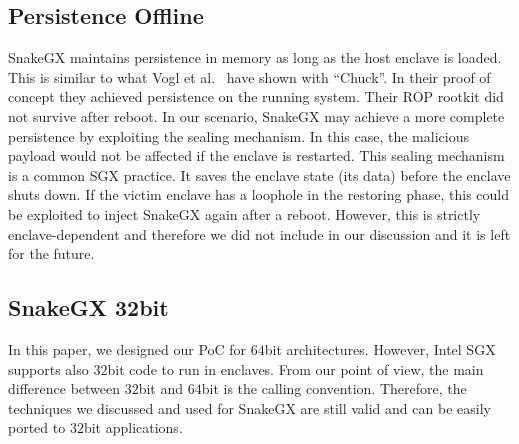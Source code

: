 \subsection{Persistence Offline}
SnakeGX maintains persistence in memory as long as the host enclave is loaded.
This is similar to what Vogl et al.~\cite{vogl2014persistent} have shown with 
``Chuck''.
In their proof of concept they achieved persistence on the running system. 
Their ROP rootkit did not survive after reboot.
In our scenario, SnakeGX may achieve a more complete persistence by exploiting 
the sealing mechanism.
In this case, the malicious payload would not be affected if the enclave is 
restarted.
This sealing mechanism is a common SGX practice. It saves the enclave state 
(\ie its data) before the enclave shuts down.
If the victim enclave has a loophole in the restoring phase, this could be 
exploited to inject SnakeGX again after a reboot.
However, this is strictly enclave-dependent and therefore we did not include in 
our discussion and it is left for the future.

\subsection{SnakeGX 32bit}
In this paper, we designed our PoC for $64$bit architectures.
However, Intel SGX supports also $32$bit code to run in enclaves.
From our point of view, the main difference between $32$bit and $64$bit is the 
calling convention.
Therefore, the techniques we discussed and used for SnakeGX are still valid and 
can be easily
ported to $32$bit applications.
